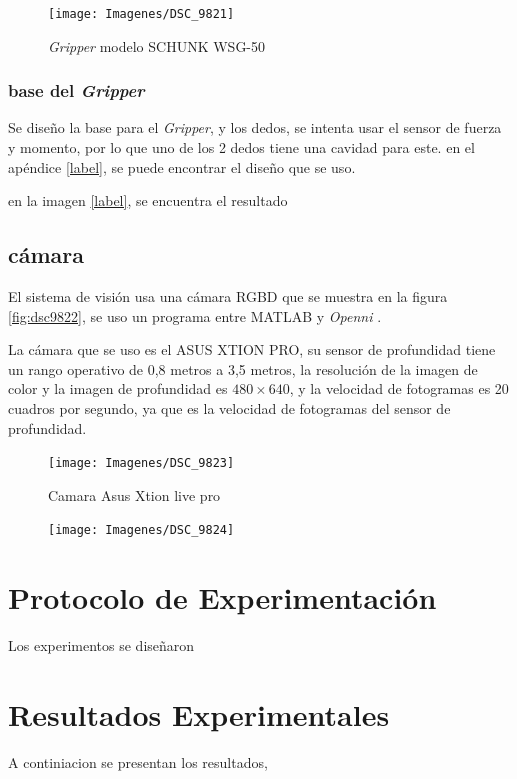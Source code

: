 \begin{figure}
	\centering
	\texttt{[image: Imagenes/DSC\_9821]}
	\caption{\textit{Gripper} modelo SCHUNK WSG-50}
	\label{fig:dsc9821}
\end{figure}

\subsubsection{base del \textit{Gripper}}
Se diseño la base para el \textit{Gripper}, y los dedos, se intenta usar el sensor de fuerza y momento, por lo que uno de los 2 dedos tiene una cavidad para este. en el apéndice \ref{label}, se puede encontrar el diseño que se uso.

en la imagen \ref{label}, se encuentra el resultado




\subsection{cámara}

El sistema de visión usa una cámara RGBD que se muestra en la figura \ref{fig:dsc9822}, se uso un programa entre MATLAB y \textit{Openni} \cite{matlabwrapper}.

La cámara que se uso es el ASUS XTION PRO, su sensor de profundidad tiene un rango operativo de 0,8 metros a 3,5 metros, la resolución de la imagen de color y la imagen de profundidad es $480 \times640$, y la velocidad de fotogramas es 20 cuadros por segundo, ya que es la velocidad de fotogramas del sensor de profundidad. \\




\begin{figure}
	\centering
	\texttt{[image: Imagenes/DSC\_9823]}
	\caption{Camara Asus Xtion live pro}
	\label{fig:dsc9823}
\end{figure}
\begin{figure}
	\centering
	\texttt{[image: Imagenes/DSC\_9824]}
	\caption{}
	\label{fig:dsc9824}
\end{figure}


\section{Protocolo de Experimentación}

Los experimentos se diseñaron 

\section{Resultados Experimentales}
A continiacion se presentan los resultados,

